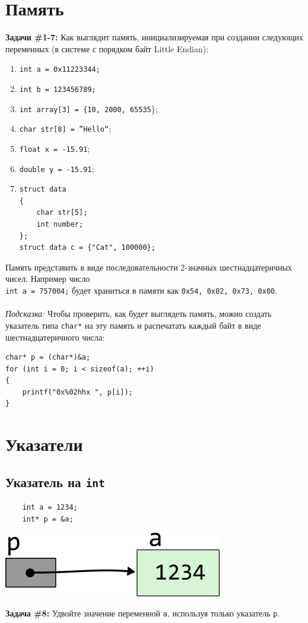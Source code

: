 \documentclass{article}
\begin{document}
\section*{Память}
\textbf{Задачи \#1-7:} Как выглядит память, инициализируемая при создании следующих переменных (в системе с порядком байт Little Endian):
\begin{multicols}{2}
\begin{enumerate}
\item \texttt{int a = 0x11223344;}
\item \texttt{int b = 123456789;}
\item \texttt{int array[3] = \{10, 2000, 65535}\};
\item \texttt{char str[8] = ''Hello``};
\item \texttt{float x = -15.91};
\item \texttt{double y = -15.91};
\item
\begin{verbatim}
struct data
{
    char str[5];
    int number;
};
struct data c = {"Cat", 100000};
\end{verbatim}
\end{enumerate}
\end{multicols}
Память представить в виде последовательности 2-значных шестнадцатеричных чисел. Например число \\
\texttt{int a = 757004;} будет храниться в памяти как \texttt{0x54, 0x82, 0x73, 0x00}. \\ \\
\textit{Подсказка:} Чтобы проверить, как будет выглядеть память, можно создать указатель типа \texttt{char*} на эту память и распечатать каждый байт в виде шестнадцатеричного числа:
\begin{lstlisting}
char* p = (char*)&a;
for (int i = 0; i < sizeof(a); ++i)
{
    printf("0x%02hhx ", p[i]);
}
\end{lstlisting}

\section*{Указатели}

\subsection*{Указатель на \texttt{int}}
\begin{multicols}{2}
\begin{lstlisting}
	int a = 1234;
	int* p = &a;
\end{lstlisting}
\columnbreak
\begin{center}
\includegraphics[scale=1]{../../images/pointer_schemes/pointer_to_int.png}
\end{center}
\end{multicols}
\textbf{Задача \#8:} Удвойте значение переменной \texttt{a}, используя только указатель \texttt{p}.
\end{document}
